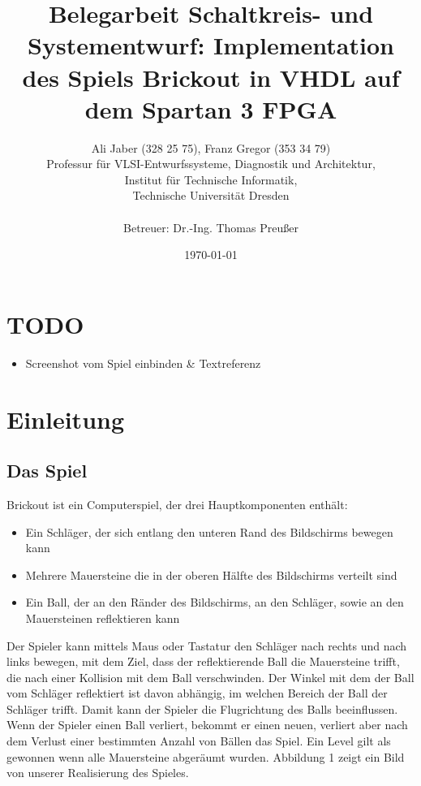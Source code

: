 \documentclass{scrartcl}
\begin{document}
\section{TODO}
\begin{itemize}
  \item Screenshot vom Spiel einbinden \& Textreferenz
\end{itemize}

\newpage

\title{Belegarbeit Schaltkreis- und Systementwurf: Implementation des Spiels Brickout in VHDL auf dem Spartan 3 FPGA}

\author{Ali Jaber (328 25 75),  Franz Gregor (353 34 79)\\
Professur für VLSI-Entwurfssysteme, Diagnostik und Architektur,\\
Institut für Technische Informatik,\\
Technische Universität Dresden\\
\\
Betreuer: Dr.-Ing. Thomas Preußer}

\date{\today}


\maketitle \newpage

\tableofcontents \newpage

\section{Einleitung}

\subsection{Das Spiel}
Brickout ist ein Computerspiel, der drei Hauptkomponenten enthält:
\begin{itemize}
  \item Ein Schläger, der sich entlang den unteren Rand des Bildschirms bewegen kann
  \item Mehrere Mauersteine die in der oberen Hälfte des Bildschirms verteilt sind
  \item Ein Ball, der an den Ränder des Bildschirms,  an den Schläger, sowie an den Mauersteinen reflektieren kann
\end{itemize}
Der Spieler kann mittels Maus oder Tastatur den Schläger nach rechts und nach links bewegen, mit dem Ziel, dass der reflektierende Ball die Mauersteine trifft, die nach einer Kollision mit dem Ball verschwinden.
Der Winkel mit dem der Ball vom Schläger reflektiert ist davon abhängig, im welchen Bereich der Ball der Schläger trifft.
Damit kann der Spieler die Flugrichtung des Balls beeinflussen.
Wenn der Spieler einen Ball verliert, bekommt er einen neuen, verliert aber nach dem Verlust einer bestimmten Anzahl von Bällen das Spiel.
Ein Level gilt als gewonnen wenn alle Mauersteine abgeräumt wurden.
Abbildung 1 zeigt ein Bild von unserer Realisierung des Spieles.
\end{document}
